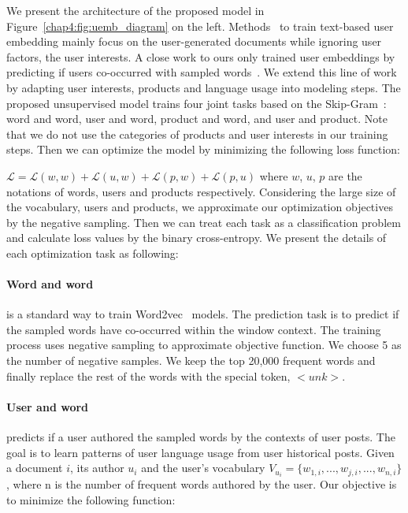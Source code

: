 We present the architecture of the proposed model in Figure~\ref{chap4:fig:uemb_diagram} on the left.
Methods~\cite{pan2019social} to train text-based user embedding mainly focus on the user-generated documents while ignoring user factors, the user interests. 
A close work to ours only trained user embeddings by predicting if users co-occurred with sampled words~\cite{amir2017quantifying}.
We extend this line of work by adapting user interests, products and language usage into modeling steps.
The proposed unsupervised model trains four joint tasks based on the Skip-Gram~\cite{mikolov2013distributed}: word and word, user and word, product and word, and user and product. 
Note that we do not use the categories of products and user interests in our training steps.
Then we can optimize the model by minimizing the following loss function: 

$\mathcal{L} = \mathcal{L}(w, w) + \mathcal{L}(u, w) + \mathcal{L}(p, w) + \mathcal{L}(p, u)$
where $w$, $u$, $p$ are the notations of words, users and products respectively.
Considering the large size of the vocabulary, users and products, we approximate our optimization objectives by the negative sampling.
Then we can treat each task as a classification problem and calculate loss values by the binary cross-entropy.
We present the details of each optimization task as following:

\paragraph{Word and word}
is a standard way to train Word2vec~\cite{mikolov2013distributed} models. The prediction task is to predict if the sampled words have co-occurred within the window context. The training process uses negative sampling to approximate objective function. We choose 5 as the number of negative samples. We keep the top 20,000 frequent words and finally replace the rest of the words with the special token, $<unk>$. 


\paragraph{User and word}
predicts if a user authored the sampled words by the contexts of user posts. The goal is to learn patterns of user language usage from user historical posts. Given a document $i$, its author $u_i$ and the user's vocabulary $V_{u_i} = \{w_{1, i}, ..., w_{j, i}, ..., w_{n, i}\}$, where n is the number of frequent words authored by the user. Our objective is to minimize the following function:

